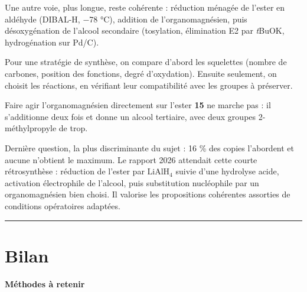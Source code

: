 \documentclass[11pt,a4paper]{article}
\begin{document}
Une autre voie, plus longue, reste cohérente : réduction ménagée de l'ester en aldéhyde (DIBAL-H, −78 °C), addition de l'organomagnésien, puis désoxygénation de l'alcool secondaire (tosylation, élimination E2 par \emph{t}BuOK, hydrogénation sur Pd/C).

\begin{methode}

Pour une stratégie de synthèse, on compare d'abord les squelettes (nombre de carbones, position des fonctions, degré d'oxydation). Ensuite seulement, on choisit les réactions, en vérifiant leur compatibilité avec les groupes à préserver.

\end{methode}

\begin{piege}

Faire agir l'organomagnésien directement sur l'ester \textbf{15} ne marche pas : il s'additionne deux fois et donne un alcool tertiaire, avec deux groupes 2-méthylpropyle de trop.

\end{piege}

\begin{jury}

Dernière question, la plus discriminante du sujet : 16 \% des copies l'abordent et aucune n'obtient le maximum. Le rapport 2026 attendait cette courte rétrosynthèse : réduction de l'ester par \(\mathrm{LiAlH_4}\) suivie d'une hydrolyse acide, activation électrophile de l'alcool, puis substitution nucléophile par un organomagnésien bien choisi. Il valorise les propositions cohérentes assorties de conditions opératoires adaptées.

\end{jury}

\begin{center}\rule{0.5\linewidth}{0.5pt}\end{center}

\hypertarget{bilan}{%
\section{Bilan}\label{bilan}}

\textbf{Méthodes à retenir}
\end{document}
